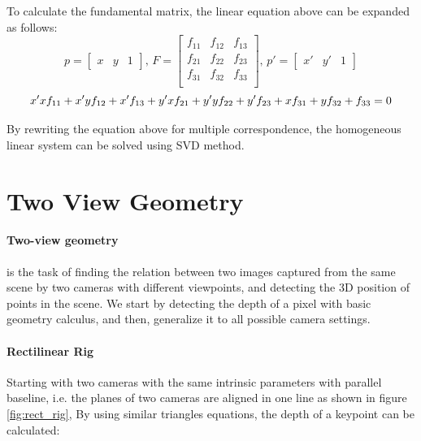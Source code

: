 \documentclass[11pt]{article}
\begin{document}
    To calculate the fundamental matrix, the linear equation above can be expanded as follows:
    \begin{equation*}
        p =
        \begin{bmatrix}
            x & y & 1
        \end{bmatrix}
        \text{, }
        F =
        \begin{bmatrix}
        f_{11} & f_{12} & f_{13} \\
        f_{21} & f_{22} & f_{23} \\
        f_{31} & f_{32} & f_{33} \\
        \end{bmatrix}
        \text{, }
        p' =
        \begin{bmatrix}
            x' & y' & 1
        \end{bmatrix}
    \end{equation*}
    \begin{equation*}
        x'xf_{11} + x'yf_{12} + x'f_{13} + y'xf_{21} + y'yf_{22} + y'f_{23} + xf_{31} + yf_{32} + f_{33} = 0 \\
    \end{equation*}

    By rewriting the equation above for multiple correspondence, the homogeneous linear system can be solved using SVD method.

    \section{Two View Geometry}

    \paragraph{Two-view geometry} is the task of finding the relation between two images captured from the same scene
    by two cameras with different viewpoints, and detecting the 3D position of points in the scene. We start by
    detecting the depth of a pixel with basic geometry calculus, and then, generalize it to all possible camera settings.

    \paragraph{Rectilinear Rig} Starting with two cameras with the same intrinsic parameters with parallel baseline, i.e. the planes of
    two cameras are aligned in one line as shown in figure \ref{fig:rect_rig}, By using similar triangles equations,
    the depth of a keypoint can be calculated:
\end{document}

